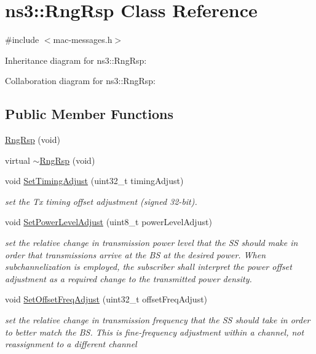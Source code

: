 \hypertarget{classns3_1_1RngRsp}{}\section{ns3\+:\+:Rng\+Rsp Class Reference}
\label{classns3_1_1RngRsp}


{\ttfamily \#include $<$mac-\/messages.\+h$>$}



Inheritance diagram for ns3\+:\+:Rng\+Rsp\+:


Collaboration diagram for ns3\+:\+:Rng\+Rsp\+:
\subsection*{Public Member Functions}
\begin{DoxyCompactItemize}
\item 
\hyperlink{classns3_1_1RngRsp_ad1460d6047ab3306ea17d42a8228134f}{Rng\+Rsp} (void)
\item 
virtual \hyperlink{classns3_1_1RngRsp_afa5b75ad063c2457b331ded3fbac0fd0}{$\sim$\+Rng\+Rsp} (void)
\item 
void \hyperlink{classns3_1_1RngRsp_a8f08f6644eb1bf48a1b2e66616151d68}{Set\+Timing\+Adjust} (uint32\+\_\+t timing\+Adjust)
\begin{DoxyCompactList}\small\item\em set the Tx timing offset adjustment (signed 32-\/bit). \end{DoxyCompactList}\item 
void \hyperlink{classns3_1_1RngRsp_a86a77741b095cb28d7c0794562d3c3b5}{Set\+Power\+Level\+Adjust} (uint8\+\_\+t power\+Level\+Adjust)
\begin{DoxyCompactList}\small\item\em set the relative change in transmission power level that the SS should make in order that transmissions arrive at the BS at the desired power. When subchannelization is employed, the subscriber shall interpret the power offset adjustment as a required change to the transmitted power density. \end{DoxyCompactList}\item 
void \hyperlink{classns3_1_1RngRsp_aaf2c03f85edf379b19ef863b03f59395}{Set\+Offset\+Freq\+Adjust} (uint32\+\_\+t offset\+Freq\+Adjust)
\begin{DoxyCompactList}\small\item\em set the relative change in transmission frequency that the SS should take in order to better match the BS. This is fine-\/frequency adjustment within a channel, not reassignment to a different channel \end{DoxyCompactList}\item 

\end{DoxyCompactItemize}
